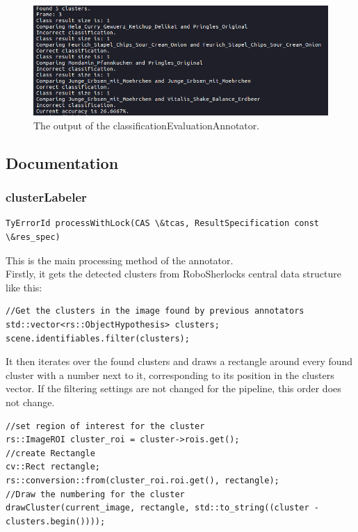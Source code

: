 \documentclass[main.tex]{subfiles}
\begin{document}
\begin{figure}
  \includegraphics[width=\linewidth]{pictures/perception/accuracy.png}
  \caption{The output of the classificationEvaluationAnnotator.}
  \label{fig:classificationEvaluationAnnotator output}
\end{figure}

\subsection{Documentation}
\subsubsection{clusterLabeler}
\begin{lstlisting}
TyErrorId processWithLock(CAS \&tcas, ResultSpecification const \&res_spec)
\end{lstlisting}
This is the main processing method of the annotator.\\

Firstly, it gets the detected clusters from RoboSherlocks central data structure like this: \label{getting the detected clusters.}

\begin{lstlisting}
//Get the clusters in the image found by previous annotators
std::vector<rs::ObjectHypothesis> clusters;
scene.identifiables.filter(clusters);
\end{lstlisting}

It then iterates over the found clusters and draws a rectangle around every found cluster with a number next to it, corresponding to its position in the clusters vector. If the filtering settings are not changed for the pipeline, this order does not change.

\begin{lstlisting}
//set region of interest for the cluster
rs::ImageROI cluster_roi = cluster->rois.get();
//create Rectangle
cv::Rect rectangle;
rs::conversion::from(cluster_roi.roi.get(), rectangle);
//Draw the numbering for the cluster
drawCluster(current_image, rectangle, std::to_string((cluster - clusters.begin())));
\end{lstlisting}
\end{document}
